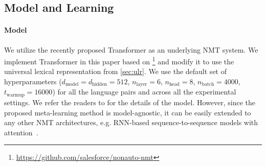 \subsection{Model and Learning}

\paragraph{Model} 

We utilize the recently proposed Transformer \citep{vaswani2017attention} as an underlying NMT system. We implement Transformer in this paper based on \citep{Gu2017NonAutoregressiveNM}\footnote{
    \url{https://github.com/salesforce/nonauto-nmt}
}
and modify it to use the universal lexical representation from \textsection\ref{sec:ulr}. We use the default set of hyperparameters ($d_\text{model} = d_{\text{hidden}} = 512$, $n_\text{layer}=6$, $n_\text{head}=8$, $n_\text{batch}=4000$, $t_\text{warmup} = 16000$) for all the language pairs and across all the experimental settings. We refer the readers to \citep{vaswani2017attention,Gu2017NonAutoregressiveNM} for the details of the model. However, since the proposed meta-learning method is model-agnostic, it can be easily extended to any other NMT architectures, e.g. RNN-based sequence-to-sequence models with attention~\citep{bahdanau2014neural}.







